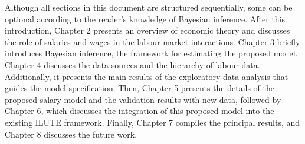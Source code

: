 Although all sections in this document are structured 
sequentially, some can be optional according to the reader's 
knowledge of Bayesian inference. After this introduction, 
Chapter 2 presents an overview of economic theory and discusses 
the role of salaries and wages in the labour market interactions. 
Chapter 3 briefly introduces Bayesian inference, the framework 
for estimating the proposed model. Chapter 4 discusses the data 
sources and the hierarchy of labour data. Additionally, it 
presents the main results of the exploratory data analysis that 
guides the model specification. Then, Chapter 5 presents the 
details of the proposed salary model and the validation results 
with new data, followed by Chapter 6, which discusses the 
integration of this proposed model into the existing ILUTE 
framework. Finally, Chapter 7 compiles the principal results, 
and Chapter 8 discusses the future work.